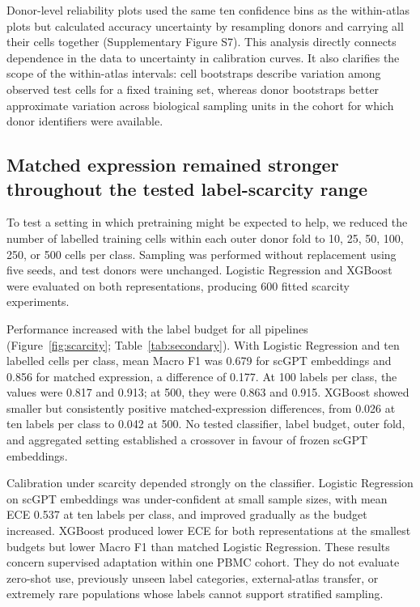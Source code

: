 Donor-level reliability plots used the same ten confidence bins as the within-atlas plots but calculated accuracy uncertainty by resampling donors and carrying all their cells together (Supplementary Figure S7). This analysis directly connects dependence in the data to uncertainty in calibration curves. It also clarifies the scope of the within-atlas intervals: cell bootstraps describe variation among observed test cells for a fixed training set, whereas donor bootstraps better approximate variation across biological sampling units in the cohort for which donor identifiers were available.

\subsection{Matched expression remained stronger throughout the tested label-scarcity range}

To test a setting in which pretraining might be expected to help, we reduced the number of labelled training cells within each outer donor fold to 10, 25, 50, 100, 250, or 500 cells per class. Sampling was performed without replacement using five seeds, and test donors were unchanged. Logistic Regression and XGBoost were evaluated on both representations, producing 600 fitted scarcity experiments.

Performance increased with the label budget for all pipelines (Figure~\ref{fig:scarcity}; Table~\ref{tab:secondary}). With Logistic Regression and ten labelled cells per class, mean Macro F1 was 0.679 for scGPT embeddings and 0.856 for matched expression, a difference of 0.177. At 100 labels per class, the values were 0.817 and 0.913; at 500, they were 0.863 and 0.915. XGBoost showed smaller but consistently positive matched-expression differences, from 0.026 at ten labels per class to 0.042 at 500. No tested classifier, label budget, outer fold, and aggregated setting established a crossover in favour of frozen scGPT embeddings.

Calibration under scarcity depended strongly on the classifier. Logistic Regression on scGPT embeddings was under-confident at small sample sizes, with mean ECE 0.537 at ten labels per class, and improved gradually as the budget increased. XGBoost produced lower ECE for both representations at the smallest budgets but lower Macro F1 than matched Logistic Regression. These results concern supervised adaptation within one PBMC cohort. They do not evaluate zero-shot use, previously unseen label categories, external-atlas transfer, or extremely rare populations whose labels cannot support stratified sampling.


